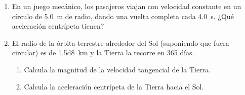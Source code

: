 \documentclass[14pt]{extarticle}
\begin{document}
\begin{enumerate}
Calcula.
\begin{enumerate}[label=\alph*)]
\item ¿Cuál será la magnitud de su velocidad angular a los \SI{5}{\second}?
\item ¿Cuál será la magnitud de su desplazamiento angular?
\item ¿Cuántas revoluciones habrá dado al término de los \SI{5}{\second}?
\end{enumerate}
\item En un juego mecánico, los pasajeros viajan con velocidad constante en un círculo de \SI{5.0}{\meter} de radio, dando una vuelta completa cada \SI{4.0}{\second}. ¿Qué aceleración centrípeta tienen?
\item El radio de la órbita terrestre alrededor del Sol (suponiendo que fuera circular) es de \SI{1.5d8}{\kilo\meter} y la Tierra la recorre en \num{365} días.
\begin{enumerate}[label=\alph*)]
\item Calcula la magnitud de la velocidad tangencial de la Tierra.
\item Calcula la aceleración centrípeta de la Tierra hacia el Sol.
\end{enumerate}
\end{enumerate}
\end{document}
